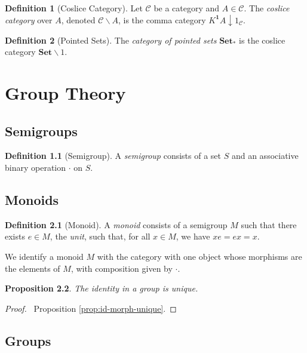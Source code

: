 \documentclass{book}
\newtheorem{prop}{Proposition}[chapter]
\theoremstyle{definition}
\newtheorem{df}[prop]{Definition}
\newcommand{\Set}{\ensuremath{\mathbf{Set}}}
\begin{document}
\begin{df}[Coslice Category]
    Let $\mathcal{C}$ be a category and $A \in \mathcal{C}$. The \emph{coslice category} over $A$, denoted $\mathcal{C} \backslash A$, is the comma category $K^{\mathbf{1}} A \downarrow 1_\mathcal{C}$.
\end{df}

\begin{df}[Pointed Sets]
    The \emph{category of pointed sets} $\Set_*$ is the coslice category $\Set \backslash 1$.
\end{df}

\part{Group Theory}

\chapter{Semigroups}

\begin{df}[Semigroup]
A \emph{semigroup} consists of a set $S$ and an associative binary operation $\cdot$ on $S$.
\end{df}

\chapter{Monoids}

\begin{df}[Monoid]
A \emph{monoid} consists of a semigroup $M$ such that there exists $e \in M$, the \emph{unit}, such that, for all $x \in M$, we have $x e = ex = x$.

We identify a monoid $M$ with the category with one object whose morphisms are the elements of $M$, with composition given by $\cdot$.
\end{df}

\begin{prop}
    The identity in a group is unique.
\end{prop}

\begin{proof}
    \pf\ Proposition \ref{prop:id-morph-unique}.
\end{proof}

\chapter{Groups}
\end{document}
